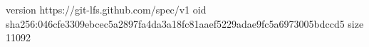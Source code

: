 version https://git-lfs.github.com/spec/v1
oid sha256:046cfe3309ebcec5a2897fa4da3a18fc81aaef5229adae9fc5a6973005bdccd5
size 11092
